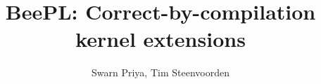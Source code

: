 \documentclass[11pt,twoside,a4paper]{article}
\begin{document}
\title{BeePL: Correct-by-compilation kernel extensions}
\author{Swarn Priya, Tim Steenvoorden}
\maketitle
\pagestyle{plain}




\end{document}
